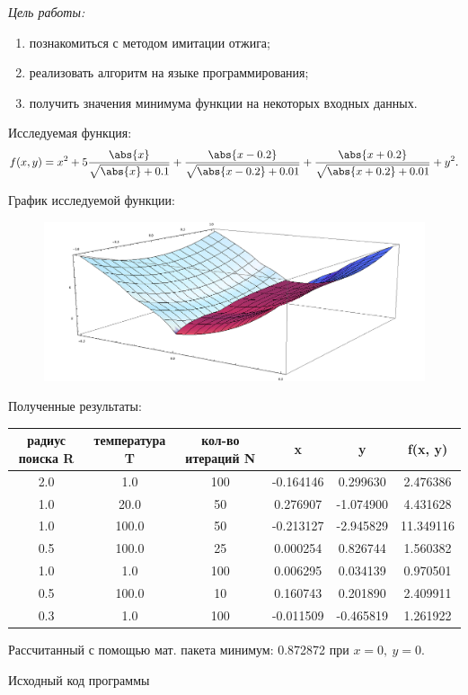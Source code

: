 \documentclass[pscyr,nonums]{hedlab}
\begin{document}
  \makeheader
  \lstset{language=python, basicstyle=\tiny, numbers=left }

  \noindent\emph{Цель работы:} 
  \begin{enumerate}
    \item познакомиться с методом имитации отжига;
    \item реализовать алгоритм на языке программирования;
    \item получить значения минимума функции на некоторых входных данных.
  \end{enumerate}

  Исследуемая функция:
  \[
    f(x, y) = x^2 + 5\frac{\abs{x}}{\sqrt{\abs{x} + 0.1}} +
      \frac{\abs{x - 0.2}}{\sqrt{\abs{x - 0.2} + 0.01}} +
      \frac{\abs{x + 0.2}}{\sqrt{\abs{x + 0.2} + 0.01}} + y^2.
  \]

  График исследуемой функции:
  \begin{figure}[h!]
    \centering
    \includegraphics[width=.8\textwidth]{graph}
  \end{figure}

  Полученные результаты:
  \begin{table}[h!]
    \center
    \begin{tabular}{|*{6}{c|}} \hline
      радиус поиска R & температура T & кол-во итераций N & 
        x & y & f(x, y) \\ \hline
      2.0 & 1.0   & 100 & -0.164146 &  0.299630 &  2.476386 \\ \hline
      1.0 & 20.0  & 50  &  0.276907 & -1.074900 &  4.431628 \\ \hline
      1.0 & 100.0 & 50  & -0.213127 & -2.945829 & 11.349116 \\ \hline
      0.5 & 100.0 & 25  &  0.000254 &  0.826744 &  1.560382 \\ \hline
      1.0 & 1.0   & 100 &  0.006295 &  0.034139 &  0.970501 \\ \hline
      0.5 & 100.0 & 10  &  0.160743 &  0.201890 &  2.409911 \\ \hline
      0.3 & 1.0   & 100 & -0.011509 & -0.465819 &  1.261922 \\ \hline
    \end{tabular}
  \end{table}
  
  Рассчитанный с помощью мат. пакета минимум: 0.872872 при
  \( x = 0,\ y = 0 \).

  \clearpage

  \noindent Исходный код программы
  
\end{document}

